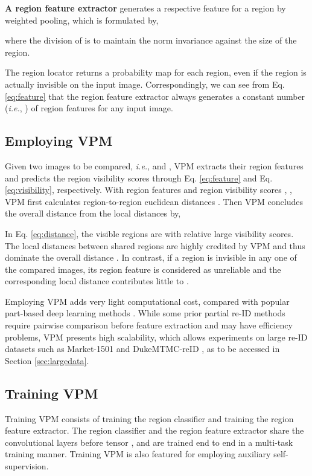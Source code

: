 \documentclass[10pt,twocolumn,letterpaper]{article}
\begin{document}
\textbf{A region feature extractor} generates a respective feature  for a region by weighted pooling, which is formulated by,
 
 where the division of  is to maintain the norm invariance against the size of the region. 
 
The region locator returns a probability map for each region, even if the region is actually invisible on the input image. Correspondingly, we can see from Eq. \ref{eq:feature} that the region feature extractor always generates a constant number (\emph{i.e.}, ) of region features for any input image.
 
 \subsection{Employing VPM}\label{sec:testing}
Given two images to be compared, \emph{i.e.},  and , VPM extracts their region features and predicts the region visibility scores through Eq. \ref{eq:feature} and Eq. \ref{eq:visibility}, respectively.
With region features and region visibility scores  , , VPM first calculates region-to-region euclidean distances . Then VPM concludes the overall distance from the local distances by, 


In Eq. \ref{eq:distance}, the visible regions are with relative large visibility scores. The local distances between shared regions are highly credited by VPM and thus dominate the overall distance . In contrast, if a region is invisible in any one of the compared images, its region feature is considered as unreliable and the corresponding local distance contributes little to . 

Employing VPM adds very light computational cost, compared with popular part-based deep learning methods \cite{PCB_ECCV, Zhao2017Deeply,cvpr2018:SPReID}. While some prior partial re-ID methods require pairwise comparison before feature extraction and may have efficiency problems, VPM presents high scalability, which allows experiments on large re-ID datasets such as Market-1501 \cite{DBLP:conf/iccv/ZhengSTWWT15} and DukeMTMC-reID \cite{zheng2017unlabeled}, as to be accessed in Section \ref{sec:largedata}.

\subsection{Training VPM}
Training VPM consists of training the region classifier and training the region feature extractor. The region classifier and the region feature extractor share the convolutional layers before tensor , and are trained end to end in a multi-task training manner. Training VPM is also featured for employing auxiliary self-supervision.
\end{document}

